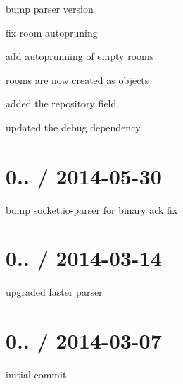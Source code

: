 \begin{DoxyItemize}
\item bump parser version
\item fix room autopruning
\item add autoprunning of empty rooms
\item rooms are now created as objects
\item added the repository field.
\item updated the debug dependency.
\end{DoxyItemize}

\section*{0.. / 2014-\/05-\/30 }


\begin{DoxyItemize}
\item bump {\ttfamily socket.\+io-\/parser} for binary ack fix
\end{DoxyItemize}

\section*{0.. / 2014-\/03-\/14 }


\begin{DoxyItemize}
\item upgraded faster parser
\end{DoxyItemize}

\section*{0.. / 2014-\/03-\/07 }


\begin{DoxyItemize}
\item initial commit 
\end{DoxyItemize}